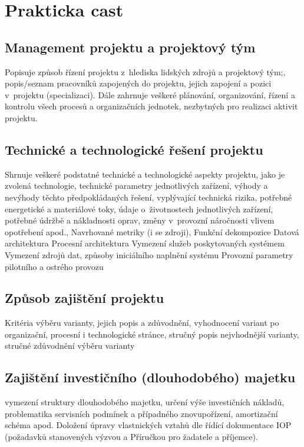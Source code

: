\documentclass[
	12pt, oneside, printed, final, 
	table,   %
	lof,     %
	lot     %
]{fithesis3}
\begin{document}
{\chapter{Prakticka cast}

\section{Management projektu a projektový tým}

Popisuje způsob řízení projektu z~hlediska lidských zdrojů a projektový tým;,
popis/seznam pracovníků zapojených do projektu, jejich zapojení a pozici v~projektu
(specializaci). Dále zahrnuje veškeré plánování, organizování, řízení a kontrolu všech
procesů a organizačních jednotek, nezbytných pro realizaci aktivit projektu.

\section{Technické a technologické řešení projektu}

Shrnuje veškeré podstatné technické a technologické aspekty projektu, jako je
zvolená technologie, technické parametry jednotlivých zařízení, výhody a nevýhody
těchto předpokládaných řešení, vyplývající technická rizika, potřebné energetické a
materiálové toky, údaje o~životnostech jednotlivých zařízení, potřebné údržbě a
nákladnosti oprav, změny v~provozní náročnosti vlivem opotřebení apod.,
Navrhované metriky (i se zdroji),
Funkční dekompozice
Datová architektura
Procesní architektura
Vymezení služeb poskytovaných systémem
Vymezení zdrojů dat, způsoby iniciálního naplnění systému
Provozní parametry pilotního a ostrého provozu

\section{Způsob zajištění projektu}

Kritéria výběru varianty, jejich popis a zdůvodnění, vyhodnocení variant po
organizační, procesní i technologické stránce, stručný popis nejvhodnější varianty,
stručné zdůvodnění výběru varianty

\section{ Zajištění investičního (dlouhodobého) majetku}

vymezení struktury dlouhodobého majetku, určení výše investičních nákladů,
problematika servisních podmínek a případného znovupořízení, amortizační schéma
apod.
Doložení úpravy vlastnických vztahů dle řídící dokumentace IOP (požadavků
stanovených výzvou a Příručkou pro žadatele a příjemce).

}
\end{document}
